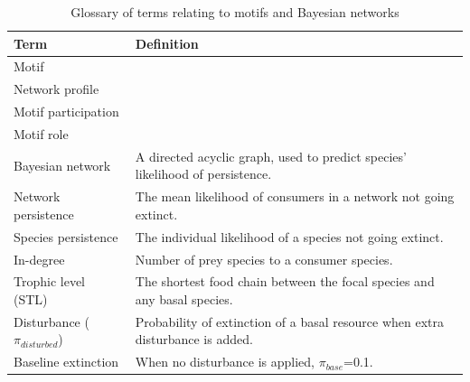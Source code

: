 \documentclass[12pt]{article}
\begin{document}
\begin{spacing}{2.0}
\begin{table}[h!]
\label{glossary}
\caption{Glossary of terms relating to motifs and Bayesian networks}

\begin{tabular}{l|l}
    Term & Definition \\
    \hline
    Motif &  \\
    Network profile & \\
    Motif participation & \\
    Motif role & \\
    Bayesian network & A directed acyclic graph, used to predict species' likelihood of persistence. \\
    Network persistence & The mean likelihood of consumers in a network not going extinct.\\
    Species persistence & The individual likelihood of a species not going extinct.\\
    In-degree & Number of prey species to a consumer species.\\
    Trophic level (STL) & The shortest food chain between the focal species and any basal species.\\
    Disturbance ($\pi_{disturbed}$) & Probability of extinction of a basal resource when extra disturbance is added. \\
    Baseline extinction &  When no disturbance is applied, $\pi_{base}$=0.1.\\
\end{tabular}
\end{table}



 

\end{spacing}
\end{document}

